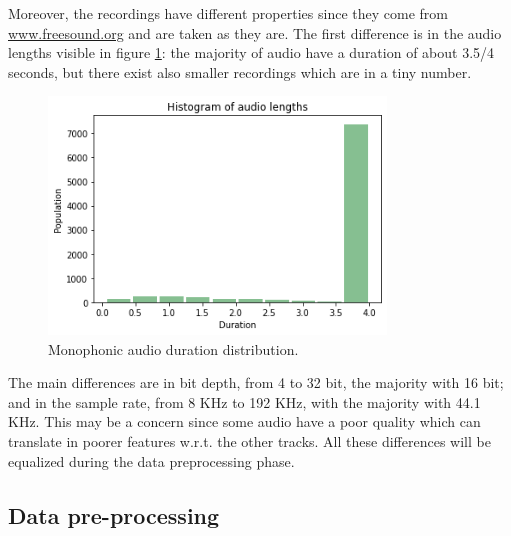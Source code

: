 \documentclass{article}
\begin{document}
Moreover, the recordings have different properties since they come from \url{www.freesound.org} and are taken as they are. The first difference is in the audio lengths visible in figure \ref{fig:mono_duration}: the majority of audio have a duration of about 3.5/4 seconds, but there exist also smaller recordings which are in a tiny number.

\begin{figure}[H]
	\centering
	\includegraphics[width=0.8\textwidth]{./images/mono/duration.png}	
	\caption{Monophonic audio duration distribution.}
	\label{fig:mono_duration}
\end{figure}

The main differences are in bit depth, from 4 to 32 bit, the majority with 16 bit; and in the sample rate, from 8 KHz to 192 KHz, with the majority with 44.1 KHz. This may be a concern since some audio have a poor quality which can translate in poorer features w.r.t. the other tracks. All these differences will be equalized during the data preprocessing phase.

\subsection{Data pre-processing}
\label{subsec:mono_feature}
\end{document}

